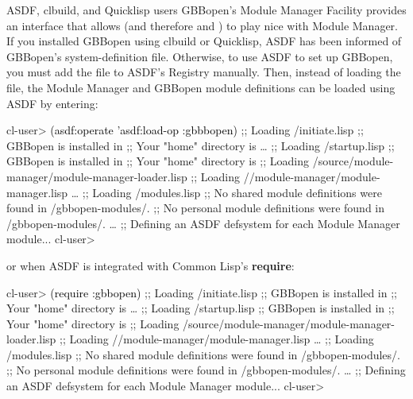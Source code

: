 \documentclass[10pt,twoside,english,pdftex]{article}
\begin{document}
%
%
\begin{notebox}{ASDF, clbuild, and Quicklisp users}
  GBBopen's Module Manager Facility provides an interface that allows
   (and therefore
   and
  ) to play nice with Module
  Manager.  If you installed GBBopen using clbuild or Quicklisp, ASDF has been
  informed of GBBopen's 
  system-definition file.  Otherwise, to use ASDF to set up GBBopen, you must
  add the  file to ASDF's Registry manually.  Then,
  instead of loading the 
  file, the Module Manager and GBBopen module definitions can be loaded using
  ASDF by entering:
%
\T\smallskip
\W\supp\notpretop
\begin{smallexample}
\textcolor{darkergray}{%
  cl-user> \textcolor{black}{(asdf:operate 'asdf:load-op :gbbbopen)}
  ;; Loading /initiate.lisp
  ;; GBBopen is installed in 
  ;; Your "home" directory is 
     \textrm{\ldots{}}
  ;; Loading /startup.lisp
  ;; GBBopen is installed in 
  ;; Your "home" directory is 
  ;;  Loading /source/module-manager/module-manager-loader.lisp
  ;; Loading //module-manager/module-manager.lisp
     \textrm{\ldots{}}
  ;; Loading /modules.lisp
  ;; No shared module definitions were found in /gbbopen-modules/.
  ;; No personal module definitions were found in /gbbopen-modules/.
     \textrm{\ldots{}}
  ;; Defining an ASDF defsystem for each Module Manager module...
  cl-user>}
\end{smallexample}
%
or when ASDF is integrated with Common Lisp's \textbf{require}:
%
\T\smallskip
\W\supp\notpretop
\begin{smallexample}
\textcolor{darkergray}{%
  cl-user> \textcolor{black}{(require :gbbopen)}
  ;; Loading /initiate.lisp
  ;; GBBopen is installed in 
  ;; Your "home" directory is 
     \textrm{\ldots{}}
  ;; Loading /startup.lisp
  ;; GBBopen is installed in 
  ;; Your "home" directory is 
  ;;  Loading /source/module-manager/module-manager-loader.lisp
  ;; Loading //module-manager/module-manager.lisp
     \textrm{\ldots{}}
  ;; Loading /modules.lisp
  ;; No shared module definitions were found in /gbbopen-modules/.
  ;; No personal module definitions were found in /gbbopen-modules/.
     \textrm{\ldots{}}
  ;; Defining an ASDF defsystem for each Module Manager module...
  cl-user>}
\end{smallexample}


\end{notebox}
\end{document}
